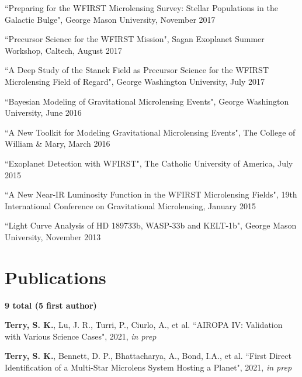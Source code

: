 \documentclass[margin,line]{cv}
\begin{document}
\begin{resume}
\begin{etaremune}
\item ``Preparing for the WFIRST Microlensing Survey: Stellar Populations in the Galactic Bulge", George Mason University, November 2017

\item ``Precursor Science for the WFIRST Mission", Sagan Exoplanet Summer Workshop, Caltech, August 2017

\item ``A Deep Study of the Stanek Field as Precursor Science for the WFIRST Microlensing Field of Regard", George Washington University, July 2017

\item ``Bayesian Modeling of Gravitational Microlensing Events", George Washington University, June 2016

\item ``A New Toolkit for Modeling Gravitational Microlensing Events", The College of William \& Mary, March 2016

\item ``Exoplanet Detection with WFIRST", The Catholic University of America, July 2015

\item ``A New Near-IR Luminosity Function in the WFIRST Microlensing Fields", 19th International Conference on Gravitational Microlensing, January 2015

\item ``Light Curve Analysis of HD 189733b, WASP-33b and KELT-1b", George Mason University, November 2013 \\

\end{etaremune}

\section{\sc Publications}
\textbf{9 total (5 first author)}\\
\begin{etaremune}
\item \textbf{Terry, S. K.}, Lu, J. R., Turri, P., Ciurlo, A., et al. ``AIROPA IV: Validation with Various Science Cases", 2021, \textit{in prep}

\item \textbf{Terry, S. K.}, Bennett, D. P., Bhattacharya, A., Bond, I.A., et al. ``First Direct Identification of a Multi-Star Microlens System Hosting a Planet", 2021, \textit{in prep}


\end{etaremune}
\end{resume}
\end{document}
